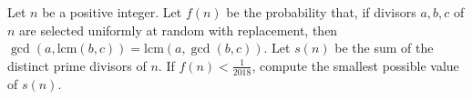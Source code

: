 Let $n$ be a positive integer. Let $f(n)$ be the probability that, if divisors $a, b, c$ of $n$ are selected uniformly at random with replacement, then $\gcd(a, \text{lcm}(b, c)) = \text{lcm}(a, \gcd(b, c))$. Let $s(n)$ be the sum of the distinct prime divisors of $n$. If $f(n) < \frac{1}{2018}$,  compute the smallest possible value of $s(n)$.